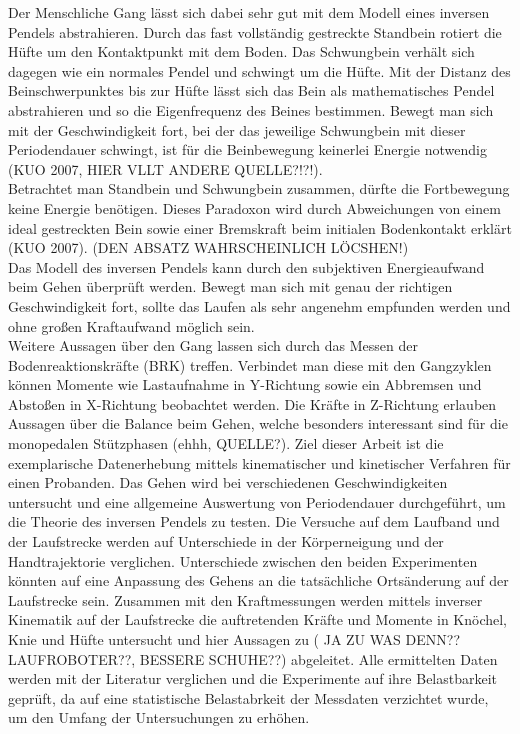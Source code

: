 Der Menschliche Gang lässt sich dabei sehr gut mit dem Modell eines inversen Pendels abstrahieren. Durch das fast vollständig gestreckte Standbein rotiert die Hüfte um den Kontaktpunkt mit dem Boden. Das Schwungbein verhält sich dagegen wie ein normales Pendel und schwingt um die Hüfte. Mit der Distanz des Beinschwerpunktes bis zur Hüfte lässt sich das Bein als mathematisches Pendel abstrahieren und so die Eigenfrequenz des Beines bestimmen. Bewegt man sich mit der Geschwindigkeit fort, bei der das jeweilige Schwungbein mit dieser Periodendauer schwingt, ist für die Beinbewegung keinerlei Energie notwendig (KUO 2007, HIER VLLT ANDERE QUELLE?!?!).\\
Betrachtet man Standbein und Schwungbein zusammen, dürfte die Fortbewegung keine Energie benötigen. Dieses Paradoxon wird durch Abweichungen von einem ideal gestreckten Bein sowie einer Bremskraft beim initialen Bodenkontakt erklärt (KUO 2007). (DEN ABSATZ WAHRSCHEINLICH LÖCSHEN!)\\
Das Modell des inversen Pendels kann durch den subjektiven Energieaufwand beim Gehen überprüft werden. Bewegt man sich mit genau der richtigen Geschwindigkeit fort, sollte das Laufen als sehr angenehm empfunden werden und ohne großen Kraftaufwand möglich sein.\\
Weitere Aussagen über den Gang lassen sich durch das Messen der Bodenreaktionskräfte (BRK) treffen. Verbindet man diese mit den Gangzyklen können Momente wie Lastaufnahme in Y-Richtung sowie ein Abbremsen und Abstoßen in X-Richtung beobachtet werden. Die Kräfte in Z-Richtung erlauben Aussagen über die Balance beim Gehen, welche besonders interessant sind für die monopedalen Stützphasen (ehhh, QUELLE?).
Ziel dieser Arbeit ist die exemplarische Datenerhebung mittels kinematischer und kinetischer Verfahren für einen Probanden. Das Gehen wird bei verschiedenen Geschwindigkeiten untersucht und eine allgemeine Auswertung von Periodendauer durchgeführt, um die Theorie des inversen Pendels zu testen. Die Versuche auf dem Laufband und der Laufstrecke werden auf Unterschiede in der Körperneigung und der Handtrajektorie verglichen. Unterschiede zwischen den beiden Experimenten könnten auf eine Anpassung des Gehens an die tatsächliche Ortsänderung auf der Laufstrecke sein. Zusammen mit den Kraftmessungen werden mittels inverser Kinematik auf der Laufstrecke die auftretenden Kräfte und Momente in Knöchel, Knie und Hüfte untersucht und hier Aussagen zu ( JA ZU WAS DENN?? LAUFROBOTER??, BESSERE SCHUHE??) abgeleitet. Alle ermittelten Daten werden mit der Literatur verglichen und die Experimente auf ihre Belastbarkeit geprüft, da auf eine statistische Belastabrkeit der Messdaten verzichtet wurde, um den Umfang der Untersuchungen zu erhöhen.\\

